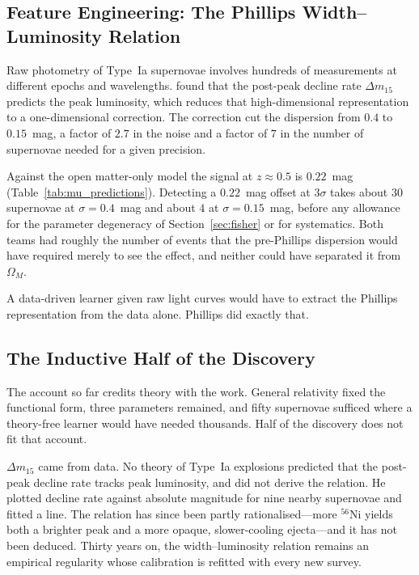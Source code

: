 \documentclass[12pt]{article}
\begin{document}
\subsection{Feature Engineering: The Phillips Width--Luminosity Relation}

Raw photometry of Type~Ia supernovae involves hundreds of measurements at
different epochs and wavelengths.  \citet{Phillips1993} found that the
post-peak decline rate $\Delta m_{15}$ predicts the peak luminosity, which
reduces that high-dimensional representation to a one-dimensional
correction.  The correction cut the dispersion from $0.4$ to $0.15$~mag, a
factor of $2.7$ in the noise and a factor of $7$ in the number of supernovae
needed for a given precision.

Against the open matter-only model the signal at $z\approx0.5$ is $0.22$~mag
(Table~\ref{tab:mu_predictions}).  Detecting a $0.22$~mag offset at $3\sigma$
takes about $30$ supernovae at $\sigma = 0.4$~mag and about $4$ at
$\sigma = 0.15$~mag, before any allowance for the parameter degeneracy of
Section~\ref{sec:fisher} or for systematics.  Both teams had roughly the
number of events that the pre-Phillips dispersion would have required merely
to see the effect, and neither could have separated it from $\Omega_M$.

A data-driven learner given raw light curves would have to extract the
Phillips representation from the data alone.  Phillips did exactly that.

\subsection{The Inductive Half of the Discovery}
\label{sec:phillips_induction}

The account so far credits theory with the work.  General relativity fixed the
functional form, three parameters remained, and fifty supernovae sufficed
where a theory-free learner would have needed thousands.  Half of the
discovery does not fit that account.

$\Delta m_{15}$ came from data.  No theory of Type~Ia explosions predicted
that the post-peak decline rate tracks peak luminosity, and
\citet{Phillips1993} did not derive the relation.  He plotted decline rate
against absolute magnitude for nine nearby supernovae and fitted a line.  The
relation has since been partly rationalised---more $^{56}$Ni yields both a
brighter peak and a more opaque, slower-cooling ejecta---and it has not been
deduced.  Thirty years on, the width--luminosity relation remains an empirical
regularity whose calibration is refitted with every new survey.
\end{document}
